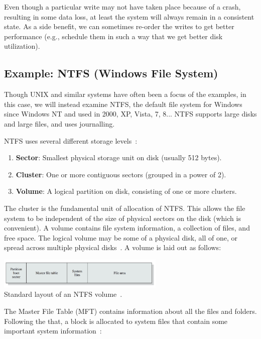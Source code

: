 Even though a particular write may not have taken place because of a crash, resulting in some data loss, at least the system will always remain in a consistent state. As a side benefit, we can sometimes re-order the writes to get better performance (e.g., schedule them in such a way that we get better disk utilization). 


\subsection*{Example: NTFS (Windows File System)}
Though UNIX and similar systems have often been a focus of the examples, in this case, we will instead examine NTFS, the default file system for Windows since Windows NT and used in 2000, XP, Vista, 7, 8... NTFS supports large disks and large files, and uses journalling. 

NTFS uses several different storage levels~\cite{osi}:

\begin{enumerate}
	\item \textbf{Sector}: Smallest physical storage unit on disk (usually 512 bytes).
	\item \textbf{Cluster}: One or more contiguous sectors (grouped in a power of 2).
	\item \textbf{Volume}: A logical partition on disk, consisting of one or more clusters. 
\end{enumerate}

The cluster is the fundamental unit of allocation of NTFS. This allows the file system to be independent of the size of physical sectors on the disk (which is convenient). A volume contains file system information, a collection of files, and free space. The logical volume may be some of a physical disk, all of one, or spread across multiple physical disks~\cite{osi}. A volume is laid out as follows:

\begin{center}
	\includegraphics[width=0.6\textwidth]{images/ntfs-volume.png}\\
	Standard layout of an NTFS volume~\cite{osi}.
\end{center}

The Master File Table (MFT) contains information about all the files and folders. Following the that, a block is allocated to system files that contain some important system information~\cite{osi}:

